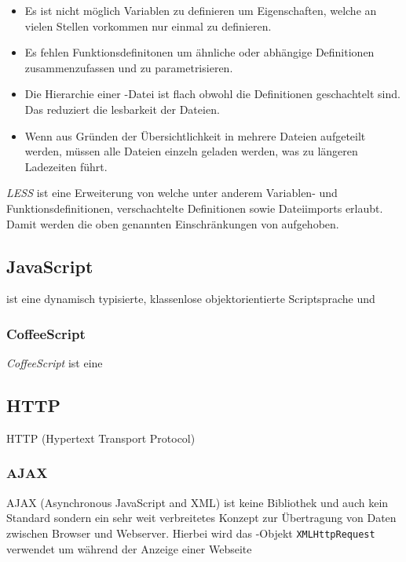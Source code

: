 \begin{itemize} 
  \item Es ist nicht möglich Variablen zu definieren um Eigenschaften, welche an
vielen Stellen vorkommen nur einmal zu definieren. 
  \item Es fehlen Funktionsdefinitonen um ähnliche
oder abhängige Definitionen  zusammenzufassen und zu parametrisieren. 
  \item Die Hierarchie einer
-Datei ist flach obwohl die Definitionen geschachtelt sind. Das reduziert die lesbarkeit
der Dateien. 
  \item Wenn aus Gründen der Übersichtlichkeit  in mehrere Dateien aufgeteilt
werden, müssen alle Dateien einzeln geladen werden, was zu längeren Ladezeiten führt. \end{itemize}

\textit{LESS} ist eine Erweiterung von  welche unter anderem  Variablen- und
Funktionsdefinitionen, verschachtelte Definitionen sowie  Dateiimports erlaubt. Damit werden die
oben genannten Einschränkungen von  aufgehoben.

\subsection{JavaScript}

 ist eine dynamisch typisierte, klassenlose objektorientierte  Scriptsprache und

\subsubsection{CoffeeScript}

\textit{CoffeeScript} ist eine

\subsection{HTTP}

HTTP (Hypertext Transport Protocol)

\subsubsection{AJAX}

AJAX (Asynchronous JavaScript and XML) ist keine Bibliothek und auch kein  Standard sondern ein sehr
weit verbreitetes Konzept zur Übertragung von Daten  zwischen Browser und Webserver. Hierbei wird
das -Objekt \texttt{XMLHttpRequest} verwendet um während der Anzeige einer Webseite

